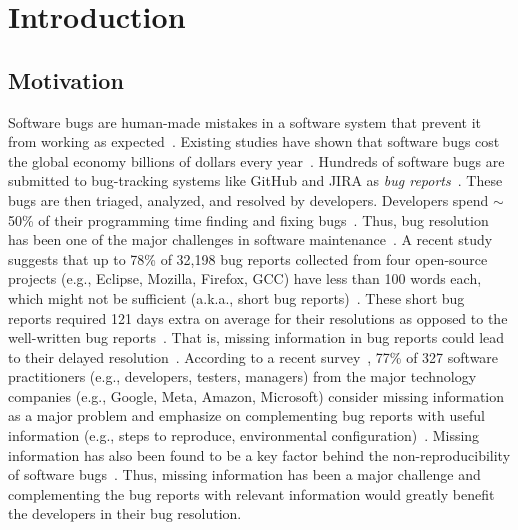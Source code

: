 \chapter{Introduction}

\section{Motivation}

Software bugs are human-made mistakes in a software system that prevent it from working as expected~\cite{ieeestandardglossaryforse}. Existing studies have shown that software bugs cost the global economy billions of dollars every year~\cite{britton2013reversible, zou2018practitioners}. Hundreds of software bugs are submitted to bug-tracking systems like GitHub and JIRA as \textit{bug reports}~\cite{anvik2006should}. These bugs are then triaged, analyzed, and resolved by developers. Developers spend $\sim$50\% of their programming time finding and fixing bugs~\cite{britton2013reversible}. Thus, bug resolution has been one of the major challenges in software maintenance~\cite{zou2018practitioners}.  A recent study suggests that up to 78\% of 32,198 bug reports collected from four open-source projects (e.g., Eclipse, Mozilla, Firefox, GCC) have less than 100 words each, which might not be sufficient (a.k.a., short bug reports)~\cite{zhang2017bug}. These short bug reports required 121 days extra on average for their resolutions as opposed to the well-written bug reports~\cite{zhang2017bug}. That is, missing information in bug reports could lead to their delayed resolution~\cite{zhang2017bug}. According to a recent survey~\cite{zou2018practitioners}, 77\%  of 327 software practitioners (e.g., developers, testers, managers) from the major technology companies (e.g., Google, Meta, Amazon, Microsoft) consider missing information as a major problem and emphasize on complementing bug reports with useful information (e.g., steps to reproduce, environmental configuration)~\cite{zou2018practitioners}. Missing information has also been found to be a key factor behind the non-reproducibility of software bugs~\cite{rahman2020some}. Thus, missing information has been a major challenge and complementing the bug reports with relevant information would greatly benefit the developers in their bug resolution.\par
